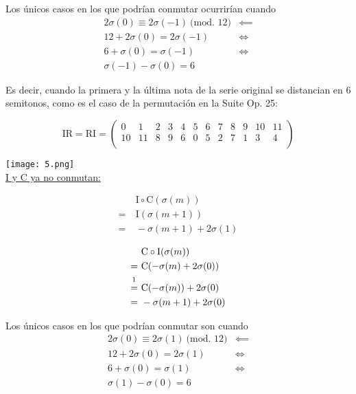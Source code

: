 		Los únicos casos en los que podrían conmutar ocurrirían cuando
		\begin{align*}
		2\sigma\left(0\right)\equiv2\sigma(-1)\ \text{(mod. 12)}&\impliedby\\
		12+2\sigma\left(0\right)=2\sigma\left(-1\right)&\Longleftrightarrow\\
		6+\sigma\left(0\right)=\sigma\left(-1\right)&\Longleftrightarrow\\
		\sigma\left(-1\right)-\sigma\left(0\right)=6&
		\end{align*}
		
		Es decir, cuando la primera y la última nota de la serie original se distancian en 6 semitonos, como es el caso de la permutación en la Suite Op. 25:
		
		\[
		\text{IR}=\text{RI}=\left(\begin{matrix}0&1&2&3&4&5&6&7&8&9&10&11\\10&11&8&9&6&0&5&2&7&1&3&4\\\end{matrix}\right)
		\]	
		
		\texttt{[image: 5.png]}\\
		
		 \underline{I y C ya no conmutan:}
		\vspace{-2\bigskipamount}
		\begin{multicols}{2}
			\begin{align*}
			&\ \text{I}\circ\text{C}(\sigma(m))\\
			=&\ \text{I}(\sigma(m+1))\\
			=&\ -\sigma(m+1)+2\sigma(1)
			\end{align*}
			
			\begin{align*}
			&\ \text{C}\circ\text{I}(\sigma(m))\\
			=&\ \text{C}(-\sigma(m)+2\sigma(0))\\
			\overset{\footnotemark}{=}&\ \text{C}(-\sigma(m))+2\sigma(0)\\
			=&\ -\sigma(m+1)+2\sigma(0)
			\end{align*}
		\end{multicols}
		
		Los únicos casos en los que podrían conmutar son cuando
		\begin{align*}
		2\sigma\left(0\right)\equiv2\sigma(1)\ \text{(mod. 12)}&\impliedby\\
		12+2\sigma\left(0\right)=2\sigma\left(1\right)&\Longleftrightarrow\\
		6+\sigma\left(0\right)=\sigma\left(1\right)&\Longleftrightarrow\\
		\sigma\left(1\right)-\sigma\left(0\right)=6&
		\end{align*}
		
